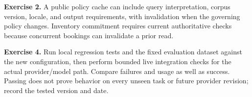 \textbf{Exercise 2.} A public policy cache can include query interpretation, corpus version, locale, and output requirements, with invalidation when the governing policy changes. Inventory commitment requires current authoritative checks because concurrent bookings can invalidate a prior read.

\textbf{Exercise 4.} Run local regression tests and the fixed evaluation dataset against the new configuration, then perform bounded live integration checks for the actual provider/model path. Compare failures and usage as well as success. Passing does not prove behavior on every unseen task or future provider revision; record the tested version and date.

